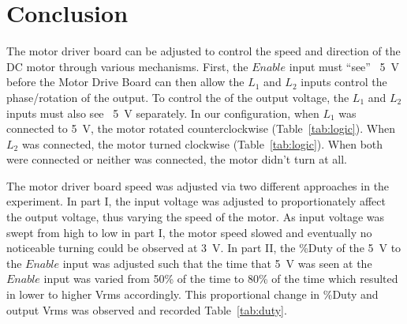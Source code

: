 \section{Conclusion}
\label{sec:conclusion}

The motor driver board can be adjusted to control the speed and direction of the DC motor through various mechanisms.  First, the $Enable$ input must ``see'' ~\SI{5}{V} before the Motor Drive Board can then allow the $L_1$ and $L_2$ inputs control the phase/rotation of the output.  To control the of the output voltage, the $L_1$ and $L_2$ inputs must also see ~\SI{5}{V} separately.  In our configuration, when $L_1$ was connected to \SI{5}{V}, the motor rotated counterclockwise (Table~\ref{tab:logic}).  When $L_2$ was connected, the motor turned clockwise (Table~\ref{tab:logic}). When both were connected or neither was connected, the motor didn't turn at all.

The motor driver board speed was adjusted via two different approaches in the experiment.  In part I, the input voltage was adjusted to proportionately affect the output voltage, thus varying the speed of the motor.  As input voltage was swept from high to low in part I, the motor speed slowed and eventually no noticeable turning could be observed at \SI{3}{V}.  In part II, the \%Duty of the \SI{5}{V} to the $Enable$ input was adjusted such that the time that \SI{5}{V} was seen at the $Enable$ input was varied from 50\% of the time to 80\% of the time which resulted in lower to higher Vrms accordingly.  This proportional change in \%Duty and output Vrms was observed and recorded Table~\ref{tab:duty}.




